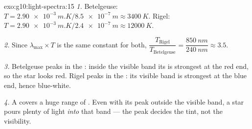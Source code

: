 \begin{solution}{exo:g10:light-spectra:15}
\emph{1.} Betelgeuse:
$T = \qty{2.90e-3}{m.K} / \qty{8.5e-7}{m} \approx \qty{3400}{K}$. Rigel:
$T = \qty{2.90e-3}{m.K} / \qty{2.4e-7}{m} \approx \qty{12000}{K}$.

\emph{2.} Since $\lambda_{\max} \times T$ is the same constant for both,
$\dfrac{T_{\text{Rigel}}}{T_{\text{Betelgeuse}}}
= \dfrac{\qty{850}{nm}}{\qty{240}{nm}} \approx 3.5$.

\emph{3.} Betelgeuse peaks in the : inside the visible band its
 is strongest at the red end, so the star looks red. Rigel peaks
in the : its visible band is strongest at the blue end, hence
blue-white.

\emph{4.} A  covers a huge range of . Even
with its peak outside the visible band, a star pours plenty of light
\emph{into} that band --- the peak decides the tint, not the visibility.
\end{solution}


